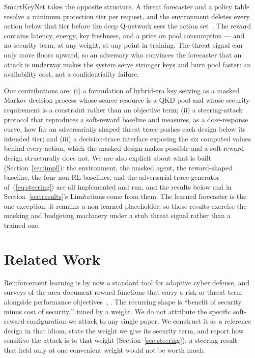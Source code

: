 \documentclass[conference]{IEEEtran}
\begin{document}
SmartKeyNet takes the opposite structure. A threat forecaster and a policy table resolve a minimum protection tier
per request, and the environment deletes every action below
that tier before the deep Q-network sees the action set~\cite{ref10}.
The reward contains latency, energy, key freshness, and a price
on pool consumption --- and no security term, at any weight, at
any point in training. The threat signal can only move floors
upward, so an adversary who convinces the forecaster that
an attack is underway makes the system serve stronger keys
and burn pool faster: an availability cost, not a confidentiality
failure.

Our contributions are: (i) a formulation of hybrid-era key
serving as a masked Markov decision process whose scarce
resource is a QKD pool and whose security requirement is a
constraint rather than an objective term; (ii) a steering-attack
protocol that reproduces a soft-reward baseline and measures,
as a dose-response curve, how far an adversarially shaped threat trace pushes each design below its intended tier; and (iii)
a decision-trace interface exposing the six computed values
behind every action, which the masked design makes possible
and a soft-reward design structurally does not. We are also
explicit about what is built (Section~\ref{sec:impl}): the environment,
the masked agent, the reward-shaped baseline, the four
non-RL baselines, and the adversarial trace generator of~(\ref{eq:steering})
are all implemented and run, and the results below and in
Section~\ref{sec:results}'s Limitations come from them. The learned
forecaster is the one exception: it remains a non-learned
placeholder, so those results exercise the masking and
budgeting machinery under a stub threat signal rather than a
trained one.

\section{Related Work}

Reinforcement learning is by now a standard tool for
adaptive cyber defense, and surveys of the area document
reward functions that carry a risk or threat term alongside
performance objectives~\cite{ref7}, \cite{ref8}. The recurring shape is ``benefit
of security minus cost of security,'' tuned by a weight. We do
not attribute the specific soft-reward configuration we attack to
any single paper. We construct it as a reference design in that
idiom, state the weight we give its security term, and report
how sensitive the attack is to that weight (Section~\ref{sec:steering}); a
steering result that held only at one convenient weight would
not be worth much.
\end{document}
